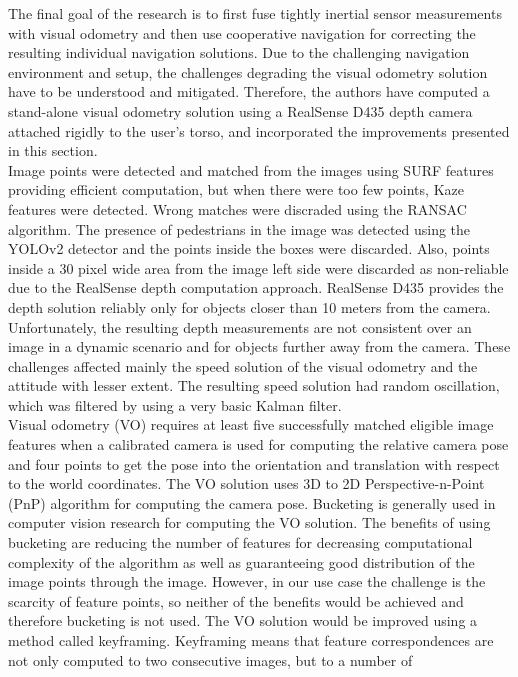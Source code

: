 The final goal of the research is to first fuse tightly inertial
sensor measurements with visual odometry and then use
cooperative navigation for correcting the resulting individual
navigation solutions. Due to the challenging navigation environment and setup, the challenges degrading the visual odometry solution have to be understood and mitigated. Therefore,
the authors have computed a stand-alone visual odometry solution
using a RealSense D435 depth camera attached rigidly to the
user’s torso, and incorporated the improvements presented in
this section.\\
Image points were detected and matched from the images
using SURF features providing efficient computation, but
when there were too few points, Kaze features were detected.
Wrong matches were discraded using the RANSAC algorithm.
The presence of pedestrians in the image was detected using the YOLOv2 detector and the points inside the boxes were discarded. Also, points inside a 30 pixel wide area from the image
left side were discarded as non-reliable due to the RealSense
depth computation approach. RealSense D435 provides
the depth solution reliably only for objects closer than
10 meters from the camera. Unfortunately, the resulting depth
measurements are not consistent over an image in a dynamic
scenario and for objects further away from the camera. These
challenges affected mainly the speed solution of the visual
odometry and the attitude with lesser extent. The resulting
speed solution had random oscillation, which was filtered by
using a very basic Kalman filter.\\
Visual odometry (VO) requires at least five successfully
matched eligible image features when a calibrated camera is
used for computing the relative camera pose and four points to
get the pose into the orientation and translation with respect
to the world coordinates. The VO solution uses 3D to 2D
Perspective-n-Point (PnP) algorithm for computing the camera
pose. Bucketing is generally used in computer vision
research for computing the VO solution. The benefits
of using bucketing are reducing the number of features for
decreasing computational complexity of the algorithm as well
as guaranteeing good distribution of the image points through
the image. However, in our use case the challenge is the
scarcity of feature points, so neither of the benefits would be
achieved and therefore bucketing is not used. The VO solution
would be improved using a method called keyframing.
Keyframing means that feature correspondences are not only
computed to two consecutive images, but to a number of
